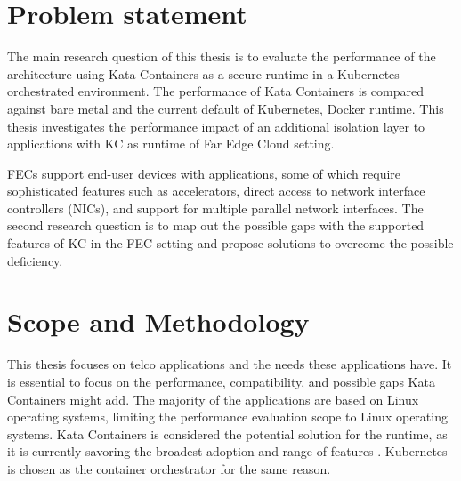 \section{Problem statement}
\label{section:intro_problemstatement}

The main research question of this thesis is to evaluate the performance of the architecture using Kata Containers as a secure runtime in a Kubernetes orchestrated environment. The performance of Kata Containers is compared against bare metal and the current default of Kubernetes, Docker runtime. This thesis investigates the performance impact of an additional isolation layer to applications with KC as runtime of Far Edge Cloud setting.

FECs support end-user devices with applications, some of which require sophisticated features such as accelerators, direct access to network interface controllers (NICs), and support for multiple parallel network interfaces. The second research question is to map out the possible gaps with the supported features of KC in the FEC setting and propose solutions to overcome the possible deficiency.





\section{Scope and Methodology}
\label{section:intro_scopemethodology}

This thesis focuses on telco applications and the needs these applications have. It is essential to focus on the performance, compatibility, and possible gaps Kata Containers might add. The majority of the applications are based on Linux operating systems, limiting the performance evaluation scope to Linux operating systems. Kata Containers is considered the potential solution for the runtime, as it is currently savoring the broadest adoption and range of features \cite{Flauzac2020}. Kubernetes is chosen as the container orchestrator for the same reason.

